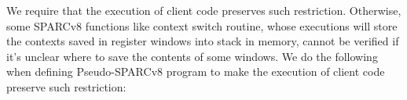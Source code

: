 We require that the execution of client code
preserves such restriction. Otherwise, some SPARCv8
functions like context switch routine, whose
executions will store the contexts saved in
register windows into stack in memory, cannot be
verified if it's unclear where to save the
contents of some windows.
We do the following when defining
Pseudo-SPARCv8 program to make the execution
of client code preserve such restriction:

